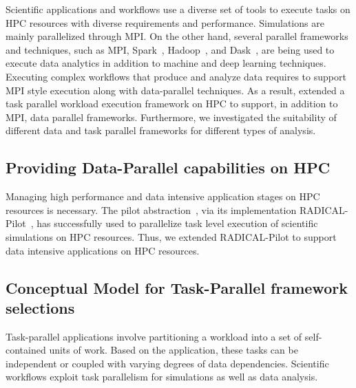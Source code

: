 \label{prior_work}
Scientific applications and workflows use a diverse set of tools to execute 
tasks on HPC resources with diverse requirements and performance. Simulations 
are mainly parallelized through MPI. On the other hand, several parallel 
frameworks and techniques, such as MPI, Spark~\cite{zaharia2010spark}, 
Hadoop~\cite{hadoop}, and Dask~\cite{rocklin2015dask}, are being used to 
execute data analytics in addition to machine and deep learning techniques. 
Executing complex workflows that produce and analyze data requires to support 
MPI style execution along with data-parallel techniques. As a result, extended 
a task parallel workload execution framework on HPC to support, in addition to 
MPI, data parallel frameworks. Furthermore, we investigated the suitability of 
different data and task parallel frameworks for different types of analysis.

\subsection{Providing Data-Parallel capabilities on HPC}
Managing high performance and data intensive application stages on HPC resources 
is necessary. The pilot abstraction~\cite{turilli2018comprehensive}, via its 
implementation RADICAL-Pilot~\cite{merzky2019using}, has successfully used to 
parallelize task level execution of scientific simulations on HPC resources. 
Thus, we extended RADICAL-Pilot to support data intensive applications on HPC 
resources. 


\subsection{Conceptual Model for Task-Parallel framework selections}
Task-parallel applications involve partitioning a workload into a set of self-
contained units of work. Based on the application, these tasks can be 
independent or coupled with varying degrees of data dependencies. Scientific 
workflows exploit task parallelism for simulations as well as data analysis.

